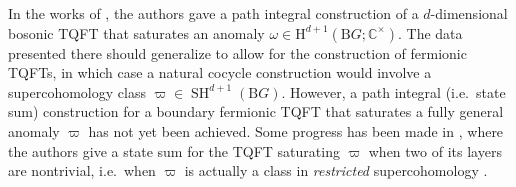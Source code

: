 \documentclass[11pt,reqno]{amsart}
\DeclareMathOperator{\SH}{SH}
\newcommand{\rH}{\mathrm{H}}
\newcommand{\rB}{\mathrm{B}}
\numberwithin{equation}{section}
\theoremstyle{plain}
\theoremstyle{definition}
\begin{document}
In the works of \cite{Witten:2016cio,Wang:2017loc}, the authors gave a path integral construction of a $d$-dimensional bosonic TQFT that saturates an anomaly $\omega \in \rH^{d+1}(\rB G;\mathbb C^\times)$. The data presented there should generalize to allow for the construction of fermionic TQFTs, in which case a natural cocycle construction would involve a supercohomology class $\varpi \in \SH^{d+1}(\rB G)$. However, a path integral (i.e.\ state sum) construction for a boundary fermionic TQFT that saturates a fully general anomaly $\varpi$ has not yet been achieved. Some progress has been made in \cite{Kobayashi:2019lep}, where the authors give a state sum for the TQFT saturating $\varpi$ when two of its layers are nontrivial, i.e.\ when $\varpi$ is actually a class in \emph{restricted} supercohomology \cite{Freed:2006mx,Gu:2012ib}.
    
\end{document}
